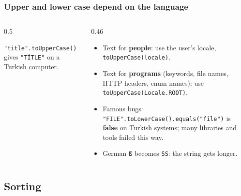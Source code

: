 \documentclass[aspectratio=169,10pt,compress]{beamer}
\begin{document}
\begin{frame}[t,fragile] \frametitle{Upper and lower case depend on the language}
  \begin{columns}[T]
    \begin{column}{0.5\textwidth}
      \begin{center}
      \end{center}
      \small \texttt{"title".toUpperCase()} gives \texttt{"TİTLE"} on a Turkish computer.
    \end{column}
    \begin{column}{0.46\textwidth}
      \begin{itemize}\small
        \item Text for \textbf{people}: use the user's locale, \texttt{toUpperCase(locale)}.
        \item Text for \textbf{programs} (keywords, file names, HTTP headers, enum names):
          use \texttt{toUpperCase(Locale.ROOT)}.
        \item Famous bugs: \texttt{"FILE".toLowerCase().equals("file")} is \textbf{false} on Turkish systems;
          many libraries and tools failed this way.
        \item German \texttt{ß} becomes \texttt{SS}: the string gets longer.
      \end{itemize}
    \end{column}
  \end{columns}
\end{frame}

\subsection[Sorting]{Sorting}
\end{document}

